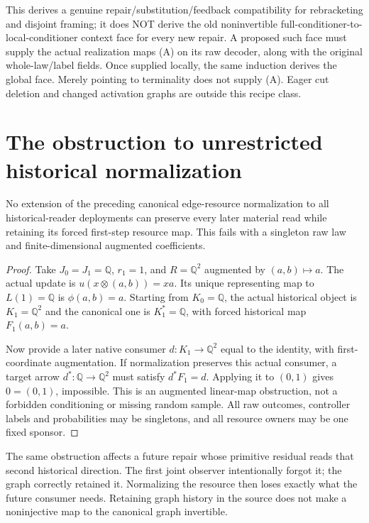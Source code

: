 \documentclass{article}
\begin{document}
This derives a genuine repair/substitution/feedback compatibility for rebracketing and disjoint framing; it does NOT derive the old noninvertible full-conditioner-to-local-conditioner context face for every new repair. A proposed such face must supply the actual realization maps (A) on its raw decoder, along with the original whole-law/label fields. Once supplied locally, the same induction derives the global face. Merely pointing to terminality does not supply (A). Eager cut deletion and changed activation graphs are outside this recipe class.

\section{The obstruction to unrestricted historical normalization}
\begin{proposition}
No extension of the preceding canonical edge-resource normalization to all historical-reader deployments can preserve every later material read while retaining its forced first-step resource map. This fails with a singleton raw law and finite-dimensional augmented coefficients.
\end{proposition}
\begin{proof}
Take $J_0=J_1=\mathbb Q$, $r_1=1$, and $R=\mathbb Q^2$ augmented by $(a,b)\mapsto a$. The actual update is $u(x\otimes(a,b))=xa$. Its unique representing map to $L(1)=\mathbb Q$ is $\phi(a,b)=a$. Starting from $K_0=\mathbb Q$, the actual historical object is $K_1=\mathbb Q^2$ and the canonical one is $K^*_1=\mathbb Q$, with forced historical map $F_1(a,b)=a$.

Now provide a later native consumer $d:K_1\to\mathbb Q^2$ equal to the identity, with first-coordinate augmentation. If normalization preserves this actual consumer, a target arrow $d^*:\mathbb Q\to\mathbb Q^2$ must satisfy $d^*F_1=d$. Applying it to $(0,1)$ gives $0=(0,1)$, impossible. This is an augmented linear-map obstruction, not a forbidden conditioning or missing random sample. All raw outcomes, controller labels and probabilities may be singletons, and all resource owners may be one fixed sponsor.\end{proof}
The same obstruction affects a future repair whose primitive residual reads that second historical direction. The first joint observer intentionally forgot it; the graph correctly retained it. Normalizing the resource then loses exactly what the future consumer needs. Retaining graph history in the source does not make a noninjective map to the canonical graph invertible.
\end{document}
